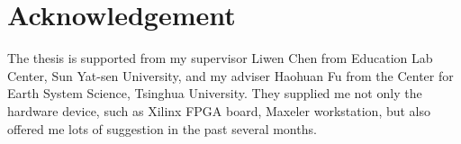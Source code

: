 \section*{Acknowledgement}

The thesis is supported from my supervisor Liwen Chen from Education Lab
Center, Sun Yat-sen University, and my adviser Haohuan Fu from the Center
for Earth System Science, Tsinghua University. They supplied me not only the
hardware device, such as Xilinx FPGA board, Maxeler workstation, but also
offered me lots of suggestion in the past several months.
